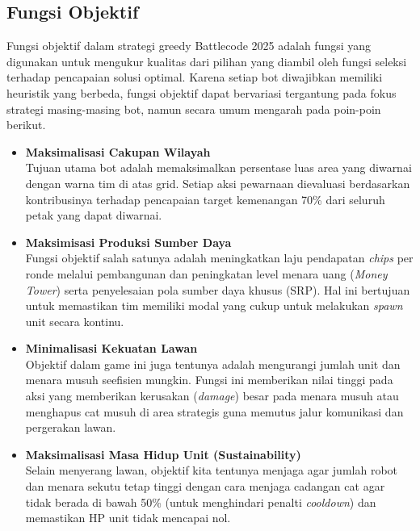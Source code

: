 \subsection{Fungsi Objektif}

Fungsi objektif dalam strategi greedy Battlecode 2025 adalah fungsi yang digunakan untuk mengukur kualitas dari pilihan yang diambil oleh fungsi seleksi terhadap pencapaian solusi optimal. Karena setiap bot diwajibkan memiliki heuristik yang berbeda, fungsi objektif dapat bervariasi tergantung pada fokus strategi masing-masing bot, namun secara umum mengarah pada poin-poin berikut.

\begin{itemize}
    \item \textbf{Maksimalisasi Cakupan Wilayah}\\
          Tujuan utama bot adalah memaksimalkan persentase luas area yang diwarnai dengan warna tim di atas grid. Setiap aksi pewarnaan dievaluasi berdasarkan kontribusinya terhadap pencapaian target kemenangan 70\% dari seluruh petak yang dapat diwarnai.

    \item \textbf{Maksimisasi Produksi Sumber Daya}\\
          Fungsi objektif salah satunya adalah meningkatkan laju pendapatan \textit{chips} per ronde melalui pembangunan dan peningkatan level menara uang (\textit{Money Tower}) serta penyelesaian pola sumber daya khusus (SRP). Hal ini bertujuan untuk memastikan tim memiliki modal yang cukup untuk melakukan \textit{spawn} unit secara kontinu.

    \item \textbf{Minimalisasi Kekuatan Lawan}\\
          Objektif dalam game ini juga tentunya adalah mengurangi jumlah unit dan menara musuh seefisien mungkin. Fungsi ini memberikan nilai tinggi pada aksi yang memberikan kerusakan (\textit{damage}) besar pada menara musuh atau menghapus cat musuh di area strategis guna memutus jalur komunikasi dan pergerakan lawan.

    \item \textbf{Maksimalisasi Masa Hidup Unit (Sustainability)}\\
          Selain menyerang lawan, objektif kita tentunya menjaga agar jumlah robot dan menara sekutu tetap tinggi dengan cara menjaga cadangan cat agar tidak berada di bawah 50\% (untuk menghindari penalti \textit{cooldown}) dan memastikan HP unit tidak mencapai nol.
\end{itemize}

